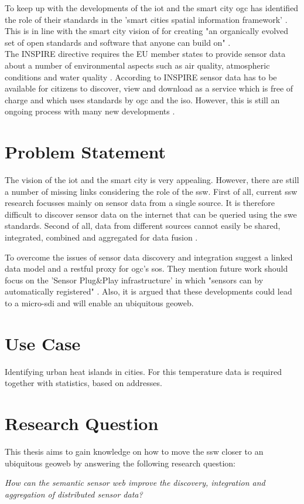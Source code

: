 To keep up with the developments of the \ac{iot} and the smart city \ac{ogc} has identified the role of their standards in the 'smart cities spatial information framework' \citep{SC:OGC}. This is in line with the smart city vision of \cite{SC:Townsend} for creating "an organically evolved set of open standards and software that anyone can build on" \citep[p. 290]{SC:Townsend}. \\

The INSPIRE directive requires the EU member states to provide sensor data about a number of environmental aspects such as air quality, atmospheric conditions and water quality \citep{SDI:INSPIRE2}. According to INSPIRE sensor data has to be available for citizens to discover, view and download as a service which is free of charge and which uses standards by \ac{ogc} and the \ac{iso}. However, this is still an ongoing process with many new developments \cite{SW:Kotsev}.   

\section{Problem Statement}
The vision of the \ac{iot} and the smart city is very appealing. However, there are still a number of missing links considering the role of the \ac{ssw}. First of all, current \ac{ssw} research focusses mainly on sensor data from a single source. It is therefore difficult to discover sensor data on the internet that can be queried using the \ac{swe} standards. Second of all, data from different sources cannot easily be shared, integrated, combined and aggregated for data fusion \citep{SSW:Wang, SSW:Ji, SSW:Corcho}. 

To overcome the issues of sensor data discovery and integration \cite{SSW:Janowicz} suggest a linked data model and a \ac{rest}ful proxy for \ac{ogc}’s \ac{sos}. They mention future work should focus on the 'Sensor Plug\&Play infrastructure' in which "sensors can by automatically registered" \cite[p. 21]{SSW:Janowicz}. Also, it is argued that these developments could lead to a \ac{micro-sdi} and will enable an ubiquitous geoweb.

\section{Use Case}
Identifying urban heat islands in cities. For this temperature data is required together with statistics, based on addresses.
 

\section{Research Question}
This thesis aims to gain knowledge on how to move the \ac{ssw} closer to an ubiquitous geoweb by answering the following research question: 

\textit{How can the semantic sensor web improve the discovery, integration and aggregation of distributed sensor data?}


